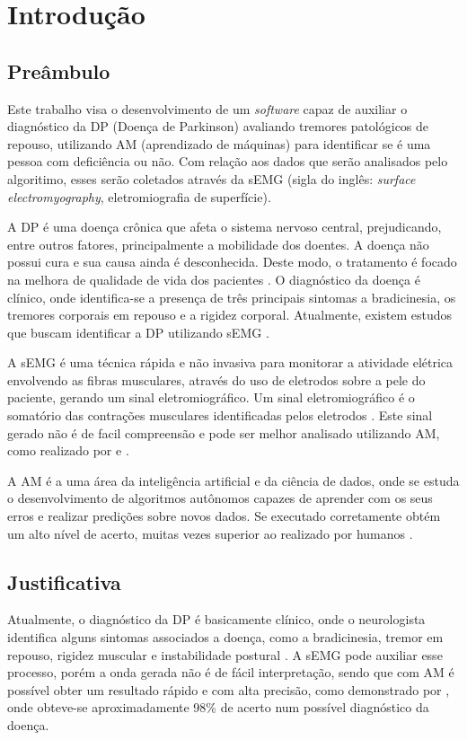\chapter[Introdução]{Introdução} 
\section{Preâmbulo} 
Este trabalho visa o desenvolvimento de um \textit{software} capaz de auxiliar o diagnóstico da DP (Doença de Parkinson) avaliando tremores patológicos de repouso, utilizando AM (aprendizado de máquinas) para identificar se é uma pessoa com deficiência ou não. Com relação aos dados que serão analisados pelo algoritimo, esses serão coletados através da sEMG (sigla do inglês: \textit{surface electromyography}, eletromiografia de superfície).

A DP é uma doença crônica que afeta o sistema nervoso central, prejudicando, entre outros fatores, principalmente a mobilidade dos doentes. A doença não possui cura e sua causa ainda é desconhecida. Deste modo, o tratamento é focado na melhora de qualidade de vida dos pacientes \cite{da2016aspectos}. O diagnóstico da doença é clínico, onde identifica-se a presença de três principais sintomas a bradicinesia, os tremores corporais em repouso e a rigidez corporal. Atualmente, existem estudos que buscam identificar a DP utilizando sEMG \cite{eftaxias2015detection}.

A sEMG é uma técnica rápida e não invasiva para monitorar a atividade elétrica envolvendo as fibras musculares, através do uso de eletrodos sobre a pele do paciente, gerando um sinal eletromiográfico. Um sinal eletromiográfico é o somatório das contrações musculares identificadas pelos eletrodos \cite{de2010eletromiografia}. Este sinal gerado não é de facil compreensão e pode ser melhor analisado utilizando AM, como realizado por  e . 

A AM é a uma área da inteligência artificial e da ciência de dados, onde se estuda o desenvolvimento de algoritmos autônomos capazes de aprender com os seus erros e realizar predições sobre novos dados. Se executado corretamente obtém um alto nível de acerto, muitas vezes superior ao realizado por humanos \cite{Kohavi}.

\section{Justificativa} 
Atualmente, o diagnóstico da DP é basicamente clínico, onde o neurologista identifica alguns sintomas associados a doença, como a bradicinesia, tremor em repouso, rigidez muscular e instabilidade postural \cite{gago2014manual}. A sEMG pode auxiliar esse processo, porém a onda gerada não é de fácil interpretação, sendo que com AM é possível obter um resultado rápido e com alta precisão, como demonstrado por , onde obteve-se aproximadamente 98\% de acerto num possível diagnóstico da doença. 

